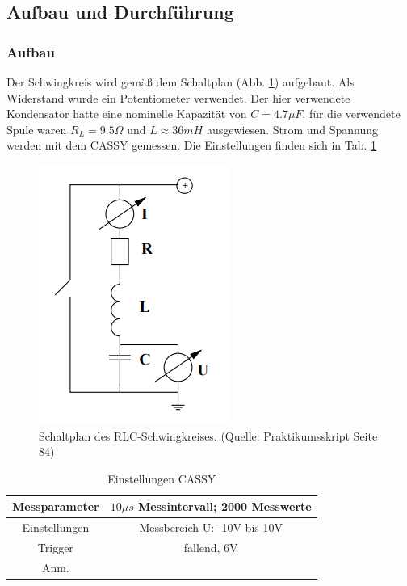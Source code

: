 \documentclass[12pt,a4paper]{article}
\begin{document}
\subsection{Aufbau und Durchführung}
\subsubsection{Aufbau}

Der Schwingkreis wird gemäß dem Schaltplan (Abb. \ref{fig:RLCSchaltung}) aufgebaut. Als Widerstand wurde ein Potentiometer verwendet. Der hier verwendete Kondensator hatte eine nominelle Kapazität von $C=4.7 \mu F$, für die verwendete Spule waren $R_L=9.5 \Omega$ und $L \approx 36mH$ ausgewiesen. Strom und Spannung werden mit dem CASSY gemessen. Die Einstellungen finden sich in Tab. \ref{tab:CASSY}

\begin{figure}
\begin{center}
\includegraphics[scale=0.8]{Bilder/RLCSchaltung.png}
\end{center}
\caption[RLC Schaltung]{Schaltplan des RLC-Schwingkreises. (Quelle: Praktikumsskript Seite 84)}
\label{fig:RLCSchaltung}
\end{figure}

\begin{table}
\begin{center}
\begin{tabular}{|c|c|}
\hline
Messparameter &  $10 \mu s$ Messintervall;  2000 Messwerte \\
\hline
Einstellungen & Messbereich U: -10V bis 10V\\
\hline
Trigger & fallend, 6V\\
\hline
Anm. & \\
\hline
\end{tabular}
\caption[CASSY]{Einstellungen CASSY}
\label{tab:CASSY}
\end{center}
\end{table}
\end{document}
